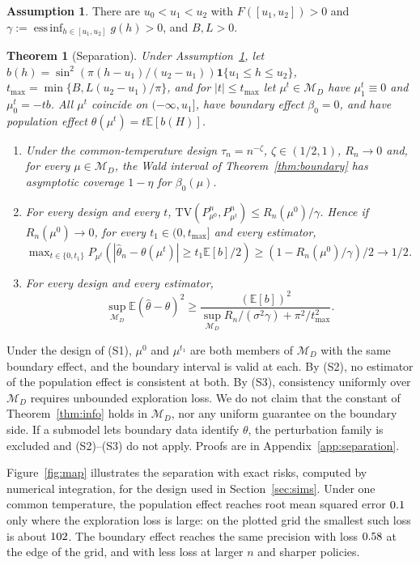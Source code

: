 \documentclass[12pt]{article}
\newtheorem{theorem}{Theorem}
\theoremstyle{definition}
\newtheorem{assumption}{Assumption}
\theoremstyle{remark}
\newcommand{\E}{\mathbb{E}}
\newcommand{\M}{\mathcal{M}}
\newcommand{\TV}{\mathrm{TV}}
\DeclareMathOperator*{\essinf}{ess\,inf}
\begin{document}
\begin{assumption}\label{ass:SA}
There are $u_0<u_1<u_2$ with $F([u_1,u_2])>0$ and
$\gamma:=\essinf_{h\in[u_1,u_2]}g(h)>0$, and $B,L>0$.
\end{assumption}

\begin{theorem}[Separation]\label{thm:separation}
Under Assumption~\ref{ass:SA}, let
$b(h)=\sin^2(\pi(h-u_1)/(u_2-u_1))\mathbf 1\{u_1\le h\le u_2\}$,
$t_{\max}=\min\{B,L(u_2-u_1)/\pi\}$, and for $|t|\le t_{\max}$ let $\mu^t\in\M_D$
have $\mu^t_1\equiv0$ and $\mu^t_0=-tb$. All $\mu^t$ coincide on
$(-\infty,u_1]$, have boundary effect $\beta_0=0$, and have population effect
$\theta(\mu^t)=t\E[b(H)]$.
\begin{enumerate}[label=(S\arabic*),leftmargin=3em,itemsep=2pt]
\item Under the common-temperature design $\tau_n=n^{-\zeta}$,
$\zeta\in(1/2,1)$, $R_n\to0$ and, for every $\mu\in\M_D$, the Wald interval of
Theorem~\ref{thm:boundary} has asymptotic coverage $1-\eta$ for $\beta_0(\mu)$.
\item For every design and every $t$,
$\TV(P^n_{\mu^0},P^n_{\mu^t})\le R_n(\mu^0)/\gamma$. Hence if
$R_n(\mu^0)\to0$, for every $t_1\in(0,t_{\max}]$ and every estimator,
$\max_{t\in\{0,t_1\}}P_{\mu^t}(|\hat\theta_n-\theta(\mu^t)|\ge t_1\E[b]/2)\ge
(1-R_n(\mu^0)/\gamma)/2\to1/2$.
\item For every design and every estimator,
\[
\sup_{\M_D}\E(\hat\theta-\theta)^2\ge\frac{(\E[b])^2}{\sup_{\M_D}R_n/(\sigma^2\gamma)+\pi^2/t_{\max}^2}.
\]
\end{enumerate}
\end{theorem}

Under the design of (S1), $\mu^0$ and $\mu^{t_1}$ are both members of $\M_D$
with the same boundary effect, and the boundary interval is valid at each.
By (S2), no estimator of the population effect is consistent at both. By
(S3), consistency uniformly over $\M_D$ requires unbounded exploration loss.
We do not claim that the constant of Theorem~\ref{thm:info} holds in
$\M_D$, nor any uniform guarantee on the boundary side. If a submodel lets
boundary data identify $\theta$, the perturbation family is excluded and
(S2)--(S3) do not apply. Proofs are in Appendix~\ref{app:separation}.

Figure~\ref{fig:map} illustrates the separation with exact risks, computed by
numerical integration, for the design used in Section~\ref{sec:sims}. Under one
common temperature, the population effect reaches root mean squared error
$0.1$ only where the exploration loss is large: on the plotted grid the
smallest such loss is about $102$. The boundary effect reaches the
same precision with loss $0.58$ at the edge of the grid, and with less
loss at larger $n$ and sharper policies.
\end{document}

